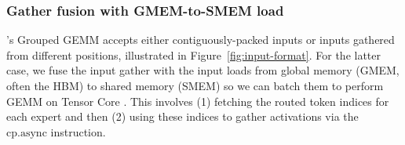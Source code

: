 





\subsubsection{Gather fusion with GMEM-to-SMEM load} \label{sec:moe:prologue}

\Algname's Grouped GEMM accepts either contiguously-packed inputs or inputs gathered from different positions, illustrated in Figure~\ref{fig:input-format}. For the latter case, we fuse the input gather with the input loads from global memory (GMEM, often the HBM) to shared memory (SMEM) so we can batch them to perform GEMM on Tensor Core \citep{tan2024scattered,costin2025momoe}. This involves (1) fetching the routed token indices for each expert and then (2) using these indices to gather activations via the $\mathrm{cp.async}$ instruction. 



